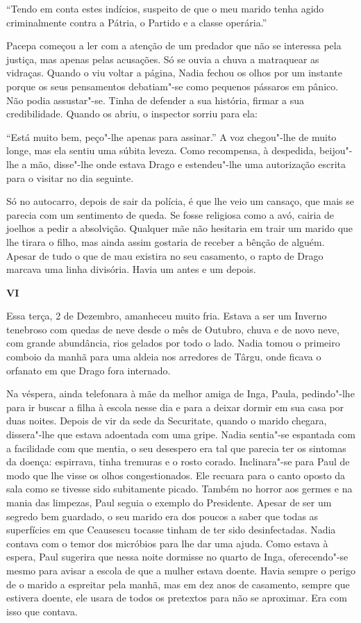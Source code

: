 ``Tendo em conta estes indícios, suspeito de que o meu marido tenha agido
criminalmente contra a Pátria, o Partido e a classe operária.''

Pacepa começou a ler com a atenção de um predador que não se interessa
pela justiça, mas apenas pelas acusações. Só se ouvia a chuva a
matraquear as vidraças. Quando o viu voltar a página, Nadia fechou os
olhos por um instante porque os seus pensamentos debatiam"-se como
pequenos pássaros em pânico. Não podia assustar"-se. Tinha de defender a sua história, firmar a sua credibilidade.
Quando os abriu, o inspector sorriu para ela:

``Está muito bem, peço"-lhe apenas para assinar.'' A voz chegou"-lhe de
muito longe, mas ela sentiu uma súbita leveza. Como recompensa, à
despedida, beijou"-lhe a mão, disse"-lhe onde estava Drago e estendeu"-lhe
uma autorização escrita para o visitar no dia seguinte.

Só no autocarro, depois de sair da polícia, é que lhe veio um cansaço,
que mais se parecia com um sentimento de queda. Se fosse religiosa como
a avó, cairia de joelhos
a pedir a absolvição. Qualquer mãe não hesitaria em trair um marido que
lhe tirara o filho, mas ainda assim gostaria de receber a bênção de
alguém. Apesar de tudo o que de mau existira no seu casamento, o rapto
de Drago marcava uma linha divisória. Havia um antes e um depois.

\pagebreak
\vspace*{1.8cm}
\noindent{}\textbf{VI}

\bigskip

Essa terça, 2 de Dezembro, amanheceu muito fria. Estava a ser um Inverno
tenebroso com quedas de neve desde o mês de Outubro, chuva e de novo
neve, com grande abundância, rios gelados por todo o lado. Nadia tomou o
primeiro comboio da manhã para uma aldeia nos arredores de Târgu, onde
ficava o orfanato em que Drago fora internado.

Na véspera, ainda telefonara à mãe da melhor amiga de Inga, Paula,
pedindo"-lhe para ir buscar a filha à escola nesse dia e para a deixar
dormir em sua casa por duas noites. Depois de vir da sede da Securitate,
quando o marido chegara, dissera"-lhe que estava adoentada com uma gripe.
Nadia sentia"-se espantada com a facilidade com que mentia, o seu
desespero era tal que parecia ter os sintomas da doença: espirrava,
tinha tremuras e o rosto corado. Inclinara"-se para Paul de modo que lhe
visse os olhos congestionados. Ele recuara para o canto oposto da sala
como se tivesse sido subitamente picado. Também no horror aos germes e
na mania das limpezas, Paul seguia o exemplo do Presidente. Apesar de
ser um segredo bem
guardado, o seu marido era dos poucos a saber que todas as superfícies
em que Ceausescu tocasse tinham de ter sido desinfectadas. Nadia contava
com o temor dos micróbios para lhe dar uma ajuda. Como estava à espera,
Paul sugerira que nessa noite dormisse no quarto de Inga, oferecendo"-se mesmo para avisar a escola de que a mulher estava doente. Havia
sempre o perigo de o marido a espreitar pela manhã, mas em dez anos de
casamento, sempre que estivera doente, ele usara de todos os pretextos
para não se aproximar. Era com isso que contava.

